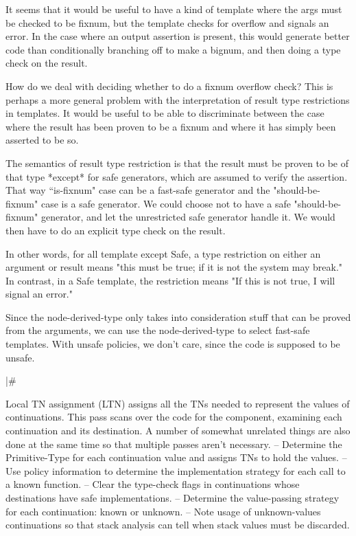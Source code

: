 It seems that it would be useful to have a kind of template where the args must
be checked to be fixnum, but the template checks for overflow and signals an
error.  In the case where an output assertion is present, this would generate
better code than conditionally branching off to make a bignum, and then doing a
type check on the result.

    How do we deal with deciding whether to do a fixnum overflow check?  This
    is perhaps a more general problem with the interpretation of result type
    restrictions in templates.  It would be useful to be able to discriminate
    between the case where the result has been proven to be a fixnum and where
    it has simply been asserted to be so.

    The semantics of result type restriction is that the result must be proven
    to be of that type *except* for safe generators, which are assumed to
    verify the assertion.  That way ``is-fixnum" case can be a fast-safe
    generator and the "should-be-fixnum" case is a safe generator.  We could
    choose not to have a safe "should-be-fixnum" generator, and let the
    unrestricted safe generator handle it.  We would then have to do an
    explicit type check on the result.

    In other words, for all template except Safe, a type restriction on either
    an argument or result means "this must be true; if it is not the system may
    break."  In contrast, in a Safe template, the restriction means "If this is
    not true, I will signal an error."

    Since the node-derived-type only takes into consideration stuff that can be
    proved from the arguments, we can use the node-derived-type to select
    fast-safe templates.  With unsafe policies, we don't care, since the code
    is supposed to be unsafe.

|\#

Local TN assignment (LTN) assigns all the TNs needed to represent the values of
continuations.  This pass scans over the code for the component, examining each
continuation and its destination.  A number of somewhat unrelated things are
also done at the same time so that multiple passes aren't necessary.
 -- Determine the Primitive-Type for each continuation value and assigns TNs
    to hold the values.
 -- Use policy information to determine the implementation strategy for each
    call to a known function.
 -- Clear the type-check flags in continuations whose destinations have safe
    implementations.
 -- Determine the value-passing strategy for each continuation: known or
    unknown.
 -- Note usage of unknown-values continuations so that stack analysis can tell
    when stack values must be discarded.
 

